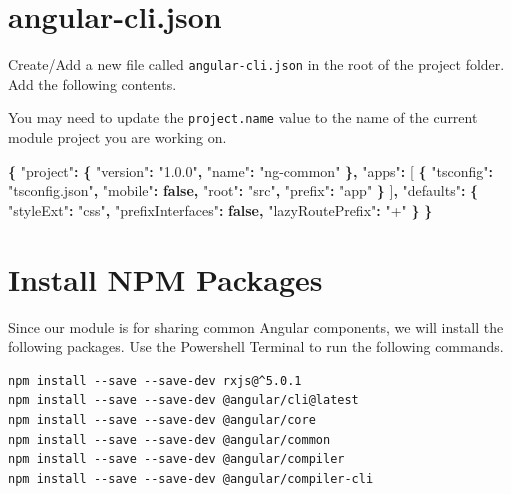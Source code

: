 \documentclass[]{book}
\newenvironment{Shaded}{\begin{snugshade}}{\end{snugshade}}
\newcommand{\KeywordTok}[1]{\textcolor[rgb]{0.13,0.29,0.53}{\textbf{#1}}}
\newcommand{\StringTok}[1]{\textcolor[rgb]{0.31,0.60,0.02}{#1}}
\newcommand{\OperatorTok}[1]{\textcolor[rgb]{0.81,0.36,0.00}{\textbf{#1}}}
\newcommand{\NormalTok}[1]{#1}
\theoremstyle{definition}
\theoremstyle{definition}
\theoremstyle{definition}
\theoremstyle{remark}
\begin{document}
\section{angular-cli.json}\label{angular-cli.json}

Create/Add a new file called \texttt{angular-cli.json} in the root of
the project folder. Add the following contents.

You may need to update the \texttt{project.name} value to the name of
the current module project you are working on.

\begin{Shaded}
\begin{Highlighting}[]
\OperatorTok{\{}
    \StringTok{"project"}\OperatorTok{:} \OperatorTok{\{}
        \StringTok{"version"}\OperatorTok{:} \StringTok{"1.0.0"}\OperatorTok{,}
        \StringTok{"name"}\OperatorTok{:} \StringTok{"ng-common"}
    \OperatorTok{\},}
    \StringTok{"apps"}\OperatorTok{:}\NormalTok{ [}
        \OperatorTok{\{}
            \StringTok{"tsconfig"}\OperatorTok{:} \StringTok{"tsconfig.json"}\OperatorTok{,}
            \StringTok{"mobile"}\OperatorTok{:} \KeywordTok{false}\OperatorTok{,}
            \StringTok{"root"}\OperatorTok{:} \StringTok{"src"}\OperatorTok{,}
            \StringTok{"prefix"}\OperatorTok{:} \StringTok{"app"}
        \OperatorTok{\}}
\NormalTok{    ]}\OperatorTok{,}
    \StringTok{"defaults"}\OperatorTok{:} \OperatorTok{\{}
        \StringTok{"styleExt"}\OperatorTok{:} \StringTok{"css"}\OperatorTok{,}
        \StringTok{"prefixInterfaces"}\OperatorTok{:} \KeywordTok{false}\OperatorTok{,}
        \StringTok{"lazyRoutePrefix"}\OperatorTok{:} \StringTok{"+"}
    \OperatorTok{\}}
\OperatorTok{\}}
\end{Highlighting}
\end{Shaded}

\section{Install NPM Packages}\label{install-npm-packages}

Since our module is for sharing common Angular components, we will
install the following packages. Use the Powershell Terminal to run the
following commands.

\begin{verbatim}
npm install --save --save-dev rxjs@^5.0.1
npm install --save --save-dev @angular/cli@latest   
npm install --save --save-dev @angular/core 
npm install --save --save-dev @angular/common
npm install --save --save-dev @angular/compiler
npm install --save --save-dev @angular/compiler-cli
\end{verbatim}
\end{document}
